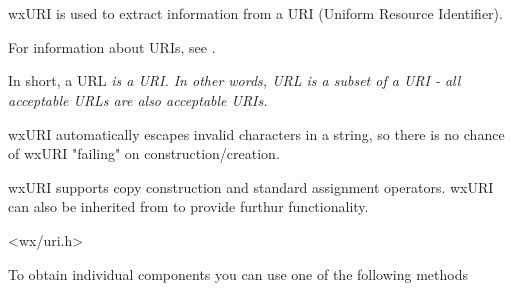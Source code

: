 
\section{}\label{wxuri}

wxURI is used to extract information from
a URI (Uniform Resource Identifier).

For information about URIs, see 
.

In short, a URL \em{is} a URI.  In other
words, URL is a subset of a URI - all 
acceptable URLs are also acceptable URIs.

wxURI automatically escapes invalid characters in a string,
so there is no chance of wxURI "failing" on construction/creation.

wxURI supports copy construction and standard assignment
operators.  wxURI can also be inherited from to provide
furthur functionality.




<wx/uri.h>






\label{obtainingwxuricomponents}

To obtain individual components you can use 
one of the following methods

\\
\\
\\
\\
\\
\\

